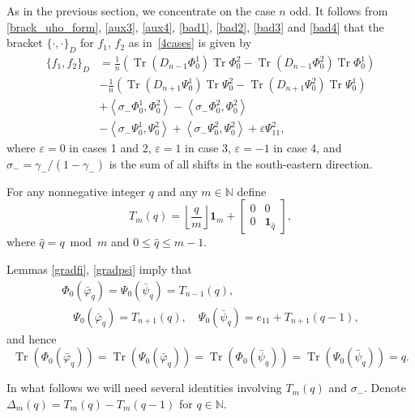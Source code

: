 \documentclass{amsart}
\theoremstyle{definition}
\theoremstyle{remark}
\numberwithin{equation}{section}
\numberwithin{theorem}{section}
\begin{document}
As in the previous section, we concentrate on the case $n$ odd.
It follows from \eqref{brack_uho_form}, \eqref{aux3},
\eqref{aux4}, \eqref{bad1}, \eqref{bad2}, \eqref{bad3} and \eqref{bad4} that the bracket 
${{\{\cdot,\cdot\}}}_D$ for $f_{1}$, $f_2$ as in~\eqref{4cases} is given by
\begin{equation}\label{omegan}
\begin{aligned}
\{f_1,f_2\}_D&=\frac 1n\left({\operatorname{Tr}}(D_{n-1}{\Phi}_0^1){\operatorname{Tr}}{\Phi}_0^2-{\operatorname{Tr}}(D_{n-1}{\Phi}_0^2){\operatorname{Tr}}{\Phi}_0^1\right)\\
&-\frac 1n\left({\operatorname{Tr}}(D_{n+1}{\Psi}_0^1){\operatorname{Tr}}{\Psi}_0^2-{\operatorname{Tr}}(D_{n+1}{\Psi}_0^2){\operatorname{Tr}}{\Psi}_0^1\right)\\
&+\left\langle\sigma_-{\Phi}_0^1,{\Phi}_0^2\right\rangle -\left\langle\sigma_-{\Phi}_0^2,{\Phi}_0^2\right\rangle\\
&-\left\langle\sigma_-{\Psi}_0^1,{\Psi}_0^2\right\rangle+\left\langle\sigma_-{\Psi}_0^2,{\Psi}_0^2\right\rangle
+\varepsilon{\Psi}_{11}^2,
\end{aligned}
\end{equation}
where $\varepsilon=0$ in cases 1 and 2, $\varepsilon=1$ in case 3, $\varepsilon=-1$ in case 4, 
and $\sigma_-=\gamma_-/(1-\gamma_-)$ is the sum of all shifts in the south-eastern direction.

For any nonnegative integer $q$ and any  $m \in \mathbb{N}$ define
$$
T_{m} (q) =\left  \lfloor  \frac q m\right \rfloor {\mathbf 1}_m + \left [
\begin{array}{cc}  0 & 0 \\ 0 & {\mathbf 1}_{\hat q}\end{array} \right ],
$$
where $\hat q=q\bmod m$ and $0\le \hat q\le m-1$.

Lemmas \ref{gradfi}, \ref{gradpsi} imply that 
\begin{gather*}
{\Phi}_0(\bar{{\varphi}}_q) ={\Psi}_0(\bar{{\psi}}_q)= T_{n-1}(q),\\ 
\quad {\Psi}_0(\bar{{\varphi}}_q) = T_{n+1}(q),
\quad {\Psi}_0(\bar{{\psi}}_q) = e_{11} + T_{n+1}(q-1),
\end{gather*}
and hence
$$
{\operatorname{Tr}}({\Phi}_0(\bar{{\varphi}}_q))={\operatorname{Tr}}({\Psi}_0(\bar{{\varphi}}_q))=
{\operatorname{Tr}}({\Phi}_0(\bar{{\psi}}_q))={\operatorname{Tr}}({\Psi}_0(\bar{{\psi}}_q))=q.
$$

In what follows we will need several identities involving $T_m(q)$ and $\sigma_-$.
Denote $\Delta_m(q)=T_m(q)-T_m(q-1)$ for $q\in {\mathbb N}$.
\end{document}
